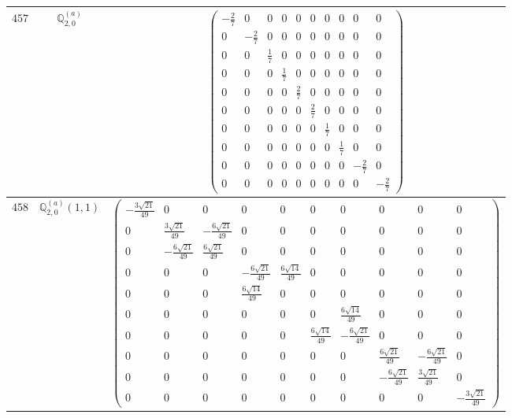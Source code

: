 \documentclass[fleqn,8pt,landscape]{jsarticle}
\begin{document}
\begin{center}
\begin{longtable}{ccc}
$ 457 $ & $ \mathbb{Q}_{2,0}^{(a)} $ & $ \begin{pmatrix} - \frac{2}{7} & 0 & 0 & 0 & 0 & 0 & 0 & 0 & 0 & 0 \\ 0 & - \frac{2}{7} & 0 & 0 & 0 & 0 & 0 & 0 & 0 & 0 \\ 0 & 0 & \frac{1}{7} & 0 & 0 & 0 & 0 & 0 & 0 & 0 \\ 0 & 0 & 0 & \frac{1}{7} & 0 & 0 & 0 & 0 & 0 & 0 \\ 0 & 0 & 0 & 0 & \frac{2}{7} & 0 & 0 & 0 & 0 & 0 \\ 0 & 0 & 0 & 0 & 0 & \frac{2}{7} & 0 & 0 & 0 & 0 \\ 0 & 0 & 0 & 0 & 0 & 0 & \frac{1}{7} & 0 & 0 & 0 \\ 0 & 0 & 0 & 0 & 0 & 0 & 0 & \frac{1}{7} & 0 & 0 \\ 0 & 0 & 0 & 0 & 0 & 0 & 0 & 0 & - \frac{2}{7} & 0 \\ 0 & 0 & 0 & 0 & 0 & 0 & 0 & 0 & 0 & - \frac{2}{7} \end{pmatrix} $ \\ \hline
$ 458 $ & $ \mathbb{Q}_{2,0}^{(a)}(1,1) $ & $ \begin{pmatrix} - \frac{3 \sqrt{21}}{49} & 0 & 0 & 0 & 0 & 0 & 0 & 0 & 0 & 0 \\ 0 & \frac{3 \sqrt{21}}{49} & - \frac{6 \sqrt{21}}{49} & 0 & 0 & 0 & 0 & 0 & 0 & 0 \\ 0 & - \frac{6 \sqrt{21}}{49} & \frac{6 \sqrt{21}}{49} & 0 & 0 & 0 & 0 & 0 & 0 & 0 \\ 0 & 0 & 0 & - \frac{6 \sqrt{21}}{49} & \frac{6 \sqrt{14}}{49} & 0 & 0 & 0 & 0 & 0 \\ 0 & 0 & 0 & \frac{6 \sqrt{14}}{49} & 0 & 0 & 0 & 0 & 0 & 0 \\ 0 & 0 & 0 & 0 & 0 & 0 & \frac{6 \sqrt{14}}{49} & 0 & 0 & 0 \\ 0 & 0 & 0 & 0 & 0 & \frac{6 \sqrt{14}}{49} & - \frac{6 \sqrt{21}}{49} & 0 & 0 & 0 \\ 0 & 0 & 0 & 0 & 0 & 0 & 0 & \frac{6 \sqrt{21}}{49} & - \frac{6 \sqrt{21}}{49} & 0 \\ 0 & 0 & 0 & 0 & 0 & 0 & 0 & - \frac{6 \sqrt{21}}{49} & \frac{3 \sqrt{21}}{49} & 0 \\ 0 & 0 & 0 & 0 & 0 & 0 & 0 & 0 & 0 & - \frac{3 \sqrt{21}}{49} \end{pmatrix} $ \\ \hline

\end{longtable}
\end{center}
\end{document}
